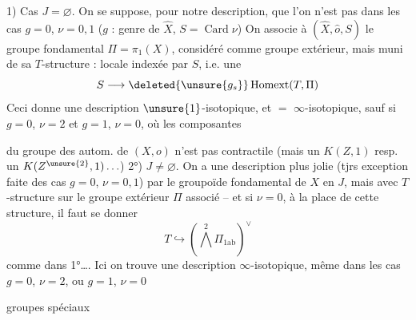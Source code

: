1) Cas $J=\varnothing$.
On se suppose, pour
notre description, que l'on n'est
pas dans les cas $g=0$, $\nu=0,1$
($g$ : genre de $\widehat X$, $S=\operatorname{Card}\nu$)
On associe à $(\widehat X,\widehat o,S)$ le
groupe fondamental $\Pi=\pi_1(X)$, considéré
comme groupe extérieur, mais
muni de sa $T$-structure :
locale indexée par $S$, i.e. une
\[S\longrightarrow\deleted{\unsure{g_s}}\operatorname{Homext}(T,\Pi)\]
Ceci donne \inserted{$=$} une description
$\unsure{1}$-isotopique, et $=$ $\infty$-isotopique,
sauf si $g=0$, $\nu=2$ et $g=1$, $\nu=0$,
où les composantes 

 du groupe des autom. de $(X,o)$
n'est pas contractile (mais un
$K(Z,1)$ resp. un $K(Z^{\unsure{2}},1)\ldots$)
2°) $J\ne\varnothing$. On a une description
plus jolie (tjrs exception faite
des cas $g=0$, $\nu=0,1$) par le
groupoïde fondamental de $X$
en $J$, mais avec $T$-structure
 sur le groupe extérieur
$\Pi$ associé -- et si $\nu=0$, à la place de
cette structure, il faut se donner
\[T\hookrightarrow(\bigwedge^2\Pi_{1\mathrm{ab}})^\vee\]
comme dans 1°\ldots. Ici on trouve
une description $\infty$-isotopique, même
dans les cas $g=0$, $\nu=2$, ou $g=1$, $\nu=0$

groupes 
spéciaux

